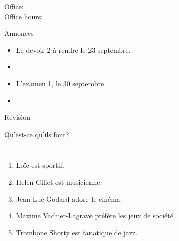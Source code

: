 \documentclass{beamer}
\subtitle[Nos loisirs]{Nos loisirs}
\begin{document}
  \begin{frame}
    \titlepage
    \tiny{Office: \\
          Office hours: }
  \end{frame}

  \begin{frame}{Annonces}
    \begin{itemize}
      \item Le devoir 2 à rendre le 23 septembre.
      \item[] 
      \item L'examen 1, le 30 septembre
      \item[] 
    \end{itemize}
  \end{frame}

  \begin{frame}{Révision}
    \begin{center}
      
    \end{center}
  \end{frame}

  \begin{frame}{Qu'est-ce qu'ils font?}
    \begin{columns}
        \begin{enumerate}
          \item Loïc est sportif.
          \item<2-> Helen Gillet est musicienne.
          \item<3-> Jean-Luc Godard adore le cinéma.
          \item<4-> Maxime Vachier-Lagrave préfère les jeux de société.
          \item<5-> Trombone Shorty est fanatique de jazz.
        \end{enumerate}
        \begin{minipage}[c][0.6\textheight]{\linewidth}
          \begin{center}
          \end{center}
        \end{minipage}
    \end{columns}
  \end{frame}
\end{document}
